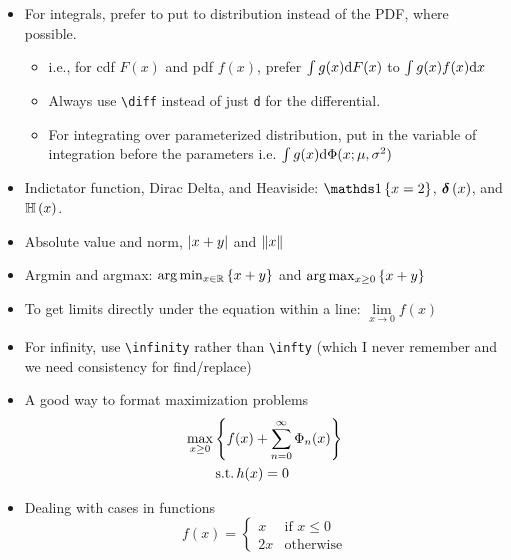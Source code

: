 \documentclass[12pt,etk-draft]{etk-article}
\begin{document}
\begin{itemize}
\begin{itemize}
\end{itemize}
\item For integrals, prefer to put to distribution instead of the PDF, where possible.
\begin{itemize}
\item i.e., for cdf $F(x)$ and pdf $f(x)$, prefer $\int g(x) \mathrm{d} F(x)$ to $\int g(x) f(x) \mathrm{d} x$
\item Always use \verb!\diff! instead of just \verb!d! for the differential.
\item For integrating over parameterized distribution, put in the variable of integration before the parameters i.e. $\int g(x) \mathrm{d} \Phi(x ; \mu, \sigma^2)$
\end{itemize}
\item Indictator function, Dirac Delta, and Heaviside: $\indicator{x = 2}$, $\boldsymbol\delta\left( {x} \right)$, and $\mathbb{H}\left( {x} \right)$.
\item Absolute value and norm, $\left| {x + y}\right|$ and $\left\| {x} \right\|$
\item Argmin and argmax: $\mathrm{arg} \min_{{x \in \mathbb{R}}}\left\{ {x + y} \right\}$ and $\mathrm{arg} \max_{{x\geq 0}}\left\{ {x + y} \right\}$
\item To get limits directly under the equation within a line: $\lim\limits_{x \to 0} f(x)$
\item For infinity, use \verb!\infinity! rather than \verb!\infty! (which I never remember and we need consistency for find/replace)
\item A good way to format maximization problems
\begin{align}
\max_{x \geq 0} &\left\{ f(x) + \sum_{n=0}^{\infty}\Phi_n(x)\right\}\\
& \,\text{s.t.}\, h(x) = 0
\end{align}
\item Dealing with cases in functions
\begin{equation}
f(x) = \begin{cases}
x & \text{if } x \leq 0\\
2 x & \text{otherwise}
\end{cases}
\end{equation}
\end{itemize}
\end{document}
